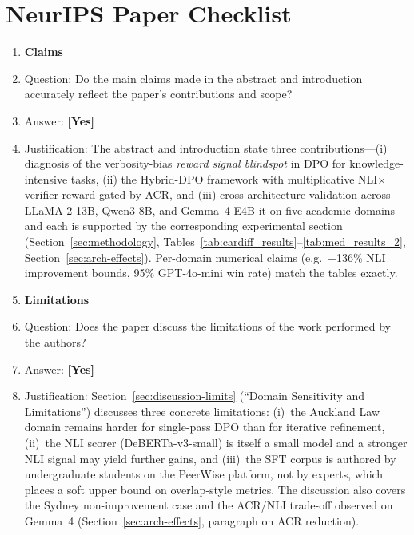 \providecommand{\answerYes}{\textcolor{blue!70!black}{\textbf{[Yes]}}}
\providecommand{\answerNo}{\textcolor{red!70!black}{\textbf{[No]}}}
\providecommand{\answerNA}{\textbf{[NA]}}
\providecommand{\answerTODO}{\textbf{[TODO]}}
\providecommand{\justificationTODO}{\textcolor{red!70!black}{[TODO]}}

\section*{NeurIPS Paper Checklist}

\begin{enumerate}

\item {\bf Claims}
    \item[] Question: Do the main claims made in the abstract and introduction accurately reflect the paper's contributions and scope?
    \item[] Answer: \answerYes{}
    \item[] Justification: The abstract and introduction state three contributions---(i) diagnosis of the verbosity-bias \emph{reward signal blindspot} in DPO for knowledge-intensive tasks, (ii) the Hybrid-DPO framework with multiplicative NLI$\times$verifier reward gated by ACR, and (iii) cross-architecture validation across LLaMA-2-13B, Qwen3-8B, and Gemma~4 E4B-it on five academic domains---and each is supported by the corresponding experimental section (Section~\ref{sec:methodology}, Tables~\ref{tab:cardiff_results}--\ref{tab:med_results_2}, Section~\ref{sec:arch-effects}). Per-domain numerical claims (e.g.\ +136\% NLI improvement bounds, 95\% GPT-4o-mini win rate) match the tables exactly.

\item {\bf Limitations}
    \item[] Question: Does the paper discuss the limitations of the work performed by the authors?
    \item[] Answer: \answerYes{}
    \item[] Justification: Section~\ref{sec:discussion-limits} (``Domain Sensitivity and Limitations'') discusses three concrete limitations: (i)~the Auckland Law domain remains harder for single-pass DPO than for iterative refinement, (ii)~the NLI scorer (DeBERTa-v3-small) is itself a small model and a stronger NLI signal may yield further gains, and (iii)~the SFT corpus is authored by undergraduate students on the PeerWise platform, not by experts, which places a soft upper bound on overlap-style metrics. The discussion also covers the Sydney non-improvement case and the ACR/NLI trade-off observed on Gemma~4 (Section~\ref{sec:arch-effects}, paragraph on ACR reduction).


\end{enumerate}
